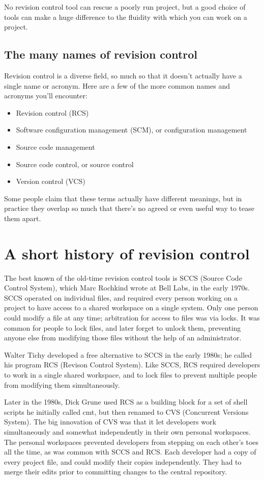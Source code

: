 No revision control tool can rescue a poorly run project, but a good
choice of tools can make a huge difference to the fluidity with which
you can work on a project.

\subsection{The many names of revision control}

Revision control is a diverse field, so much so that it doesn't
actually have a single name or acronym.  Here are a few of the more
common names and acronyms you'll encounter:
\begin{itemize}
\item Revision control (RCS)
\item Software configuration management (SCM), or configuration management
\item Source code management
\item Source code control, or source control
\item Version control (VCS)
\end{itemize}
Some people claim that these terms actually have different meanings,
but in practice they overlap so much that there's no agreed or even
useful way to tease them apart.

\section{A short history of revision control}

The best known of the old-time revision control tools is SCCS (Source
Code Control System), which Marc Rochkind wrote at Bell Labs, in the
early 1970s.  SCCS operated on individual files, and required every
person working on a project to have access to a shared workspace on a
single system.  Only one person could modify a file at any time;
arbitration for access to files was via locks.  It was common for
people to lock files, and later forget to unlock them, preventing
anyone else from modifying those files without the help of an
administrator.  

Walter Tichy developed a free alternative to SCCS in the early 1980s;
he called his program RCS (Revison Control System).  Like SCCS, RCS
required developers to work in a single shared workspace, and to lock
files to prevent multiple people from modifying them simultaneously.

Later in the 1980s, Dick Grune used RCS as a building block for a set
of shell scripts he initially called cmt, but then renamed to CVS
(Concurrent Versions System).  The big innovation of CVS was that it
let developers work simultaneously and somewhat independently in their
own personal workspaces.  The personal workspaces prevented developers
from stepping on each other's toes all the time, as was common with
SCCS and RCS.  Each developer had a copy of every project file, and
could modify their copies independently.  They had to merge their
edits prior to committing changes to the central repository.

